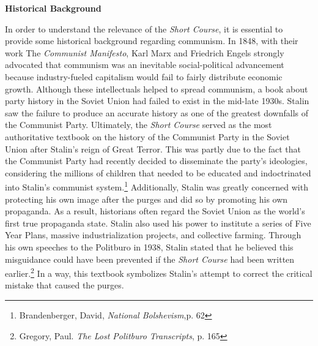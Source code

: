 \documentclass[a4paper, twocolumn]{article}
\begin{document}
\begin{center}\textbf{Historical Background}\end{center}

In order to understand the relevance of the \emph{Short Course}, it is
essential to provide some historical background regarding
communism. In 1848, with their work The \emph{Communist Manifesto}, Karl Marx
and Friedrich Engels strongly advocated that communism was an
inevitable social-political advancement because industry-fueled
capitalism would fail to fairly distribute economic growth. Although
these intellectuals helped to spread communism, a book about party history in the
Soviet Union had failed to exist in the mid-late 1930s. Stalin saw the
failure to produce an accurate history as one of the greatest
downfalls of the Communist Party. Ultimately, the \emph{Short Course} served
as the most authoritative textbook on the history of the Communist
Party in the Soviet Union after Stalin's reign of Great Terror. This
was partly due to the fact that the Communist Party had recently
decided to disseminate the party’s ideologies, considering the
millions of children that needed to be educated and indoctrinated into
Stalin’s communist system.\footnote{Brandenberger, David, \emph{National Bolshevism},p. 62} Additionally, Stalin was greatly
concerned with protecting his own image after the purges and did so by
promoting his own propaganda. As a result, historians often regard the
Soviet Union as the world's first true propaganda state. Stalin also
used his power to institute a series of Five Year Plans, massive
industrialization projects, and collective farming. Through his own
speeches to the Politburo in 1938, Stalin stated that he believed this
misguidance could have been prevented if the \emph{Short Course} had been
written earlier.\footnote{Gregory, Paul. \emph{The Lost Politburo Transcripts}, p. 165} In a way, this textbook symbolizes Stalin’s
attempt to correct the critical mistake that caused the purges.
\end{document}
